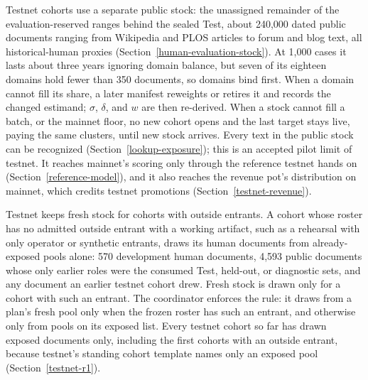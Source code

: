 Testnet cohorts use a separate public stock: the unassigned remainder of the
evaluation-reserved ranges behind the sealed Test, about 240,000 dated public
documents ranging from Wikipedia and PLOS articles to forum and blog text, all
historical-human proxies (Section~\ref{human-evaluation-stock}). At 1,000
cases it lasts about three years ignoring domain balance, but seven of its
eighteen domains hold fewer than 350 documents, so domains bind first. When a
domain cannot fill its share, a later manifest reweights or retires it and
records the changed estimand; \(\sigma\), \(\delta\), and \(w\) are then
re-derived. When a stock cannot fill a batch, or the mainnet floor, no new
cohort opens and the last target stays live, paying the same clusters, until new
stock arrives. Every text in the public stock can be recognized
(Section~\ref{lookup-exposure}); this is an accepted pilot limit of testnet.
It reaches mainnet's scoring only through the reference testnet hands on
(Section~\ref{reference-model}), and it also reaches the revenue pot's
distribution on mainnet, which credits testnet promotions
(Section~\ref{testnet-revenue}).

Testnet keeps fresh stock for cohorts with outside entrants. A cohort whose
roster has no admitted outside entrant with a working artifact, such as a
rehearsal with only operator or synthetic entrants, draws its human documents
from already-exposed pools alone: 570 development human documents, 4,593 public
documents whose only earlier roles were the consumed Test, held-out, or
diagnostic sets, and any document an earlier testnet cohort drew. Fresh stock
is drawn only for a cohort with such an entrant. The coordinator enforces the
rule: it draws from a plan's fresh pool only when the frozen roster has such an
entrant, and otherwise only from pools on its exposed list. Every testnet
cohort so far has drawn exposed documents only, including the first cohorts
with an outside entrant, because testnet's standing cohort template names only
an exposed pool (Section~\ref{testnet-r1}).

